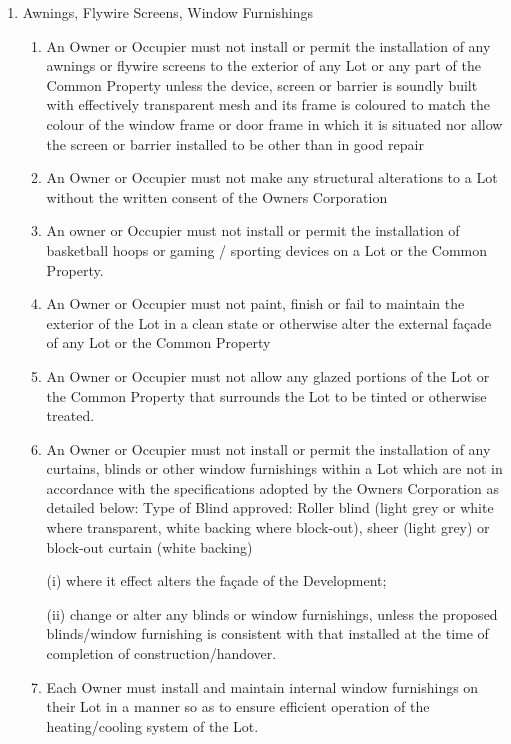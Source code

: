 \documentclass{article}
\begin{document}
\begin{enumerate}[label=\arabic*.]
\begin{enumerate}[label=\arabic{enumi}.\arabic*.]
\begin{enumerate}[label=(\arabic*)]
\item  Awnings, Flywire Screens, Window Furnishings

\begin{enumerate}[label=(\alph*)]

\item  An Owner or Occupier must not install or permit the installation of any awnings or flywire screens to the exterior of any Lot or any part of the Common Property unless the device, screen or barrier is soundly built with effectively transparent mesh and its frame is coloured to match the colour of the window frame or door frame in which it is situated nor allow the screen or barrier installed to be other than in good repair

\item  An Owner or Occupier must not make any structural alterations to a Lot without the written consent of the Owners Corporation

\item  An owner or Occupier must not install or permit the installation of basketball hoops or gaming / sporting devices on a Lot or the Common Property.
\newpage



\item  An Owner or Occupier must not paint, finish or fail to maintain the exterior of the Lot in a clean state or otherwise alter the external façade of any Lot or the Common Property

\item  An Owner or Occupier must not allow any glazed portions of the Lot or the Common Property that surrounds the Lot to be tinted or otherwise treated.

\item  An Owner or Occupier must not install or permit the installation of any curtains, blinds or other window furnishings within a Lot which are not in accordance with the specifications adopted by the Owners Corporation as detailed below: Type of Blind approved: Roller blind (light grey or white where transparent, white backing where block-out), sheer (light grey) or block-out curtain (white backing)

(i) where it effect alters the façade of the Development;

(ii) change or alter any blinds or window furnishings, unless the proposed blinds/window furnishing is consistent with that installed at the time of completion of construction/handover.

\item  Each Owner must install and maintain internal window furnishings on their Lot in a manner so as to ensure efficient operation of the heating/cooling system of the Lot.


\end{enumerate}
\end{enumerate}
\end{enumerate}
\end{enumerate}
\end{document}
